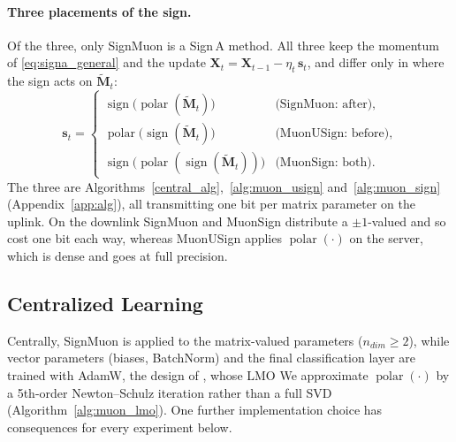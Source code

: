 \paragraph{Three placements of the sign.} Of the three, only SignMuon is a Sign\,A method. All three keep the momentum of \eqref{eq:signa_general} and the update $\mathbf{X}_t=\mathbf{X}_{t-1}-\eta_t\,\mathbf{s}_t$, and differ only in where the sign acts on $\tilde{\mathbf{M}}_t$:
\begin{equation}
\label{eq:three_placements}
\mathbf{s}_t=
\begin{cases}
\operatorname{sign}\!\bigl(\operatorname{polar}(\tilde{\mathbf{M}}_t)\bigr) & \text{(SignMuon: after)},\\[2pt]
\operatorname{polar}\!\bigl(\operatorname{sign}(\tilde{\mathbf{M}}_t)\bigr) & \text{(MuonUSign: before)},\\[2pt]
\operatorname{sign}\!\bigl(\operatorname{polar}(\operatorname{sign}(\tilde{\mathbf{M}}_t))\bigr) & \text{(MuonSign: both)}.
\end{cases}
\end{equation}
The three are Algorithms~\ref{central_alg},~\ref{alg:muon_usign} and~\ref{alg:muon_sign} (Appendix~\ref{app:alg}), all transmitting one bit per matrix parameter on the uplink. On the downlink SignMuon and MuonSign distribute a $\pm1$-valued  and so cost one bit each way, whereas MuonUSign applies $\operatorname{polar}(\cdot)$ on the server, which is dense and goes at full precision.

\subsection{Centralized Learning}
Centrally, SignMuon is applied to the matrix-valued parameters ($n_{dim}\ge 2$), while vector parameters (biases, BatchNorm) and the final classification layer are trained with AdamW, the design of \citet{jordan2024muon}, whose LMO   We approximate $\operatorname{polar}(\cdot)$ by a 5th-order Newton--Schulz iteration rather than a full SVD (Algorithm~\ref{alg:muon_lmo}). One further implementation choice has consequences for every experiment below.

